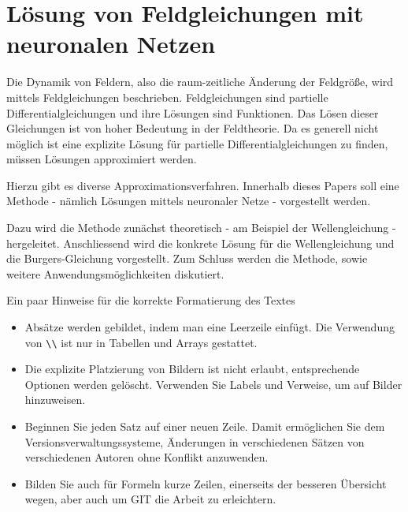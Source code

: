 %
%
%
%
\chapter{Lösung von Feldgleichungen mit neuronalen Netzen\label{chapter:neuronal}}
\begin{refsection}

Die Dynamik von Feldern, also die raum-zeitliche Änderung der Feldgröße, wird mittels Feldgleichungen beschrieben.
Feldgleichungen sind partielle Differentialgleichungen und ihre Lösungen sind Funktionen.
Das Lösen dieser Gleichungen ist von hoher Bedeutung in der Feldtheorie.
Da es generell nicht möglich ist eine explizite Lösung für partielle Differentialgleichungen zu finden, müssen Lösungen approximiert werden.

Hierzu gibt es diverse Approximationsverfahren.
Innerhalb dieses Papers soll eine Methode - nämlich Lösungen mittels neuronaler Netze - vorgestellt werden.\newline

Dazu wird die Methode zunächst theoretisch - am Beispiel der Wellengleichung - hergeleitet.
Anschliessend wird die konkrete Lösung für die Wellengleichung und die Burgers-Gleichung vorgestellt.
Zum Schluss werden die Methode, sowie weitere Anwendungsmöglichkeiten diskutiert.\newline

Ein paar Hinweise für die korrekte Formatierung des Textes
\begin{itemize}
\item
Absätze werden gebildet, indem man eine Leerzeile einfügt.
Die Verwendung von \verb+\\+ ist nur in Tabellen und Arrays gestattet.
\item
Die explizite Platzierung von Bildern ist nicht erlaubt, entsprechende
Optionen werden gelöscht. 
Verwenden Sie Labels und Verweise, um auf Bilder hinzuweisen.
\item
Beginnen Sie jeden Satz auf einer neuen Zeile. 
Damit ermöglichen Sie dem Versionsverwaltungssysteme, Änderungen
in verschiedenen Sätzen von verschiedenen Autoren ohne Konflikt 
anzuwenden.
\item 
Bilden Sie auch für Formeln kurze Zeilen, einerseits der besseren
Übersicht wegen, aber auch um GIT die Arbeit zu erleichtern.
\end{itemize}











\printbibliography[heading=subbibliography]
\end{refsection}

